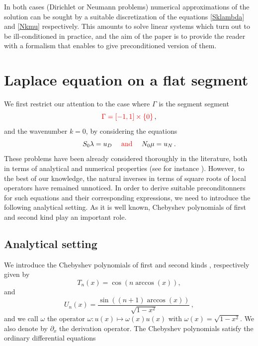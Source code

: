 \documentclass[a4paper]{article}
\begin{document}
In both cases (Dirichlet or Neumann problems) numerical approximations of the solution can be sought by a suitable 
discretization of the equations \eqref{Sklambda} and \eqref{Nkmu} respectively. This amounts to solve linear systems
which turn out to be ill-conditioned in practice, and the aim of the paper is to provide the reader with a formalism that 
enables to give preconditioned version of them.

	
\section{Laplace equation on a flat segment}

We first restrict our attention to the case where $\Gamma$ is the segment segment 
\[{\color{red}\Gamma = [-1,1] \times \{0\}}\,,\]
and the wavenumber 
$k=0$, by considering the equations 
\[S_0\lambda = u_D \quad {\color{red}\text{ and }} \quad N_0\mu = u_N\,.\]
These problems have been already considered thoroughly in the literature, both
in terms of analytical and numerical properties (see for instance \cite{jiang2004second,bruno2012second}). However, 
to the best of our knowledge, the natural inverses in terms of square roots of local operators have remained unnoticed. 
In order to derive suitable preconditonners for such equations and their corresponding expressions, we need to introduce 
the following analytical setting. As it is well known, Chebyshev polynomials of first and second kind play an important role.

\subsection{Analytical setting}

We introduce the Chebyshev polynomials of first and second kinds \cite{mason2002chebyshev}, respectively given by 
\[T_n(x) = \cos(n \arccos(x)),\]
and 
\[U_n(x) = \dfrac{\sin((n+1) \arccos(x))}{\sqrt{1 - x^2}}\,,\]
and we call $\omega$ the operator $\omega:u(x) \mapsto \omega(x)u(x)$ with $\omega(x) = \sqrt{1 - x^2}$. We also denote by  
$\partial_x$ the derivation operator. The Chebyshev polynomials satisfy the ordinary differential equations
\end{document}
